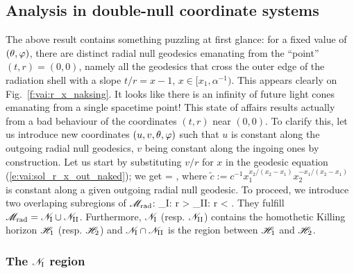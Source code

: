 \subsection{Analysis in double-null coordinate systems}

The above result contains something puzzling at first glance: for a fixed
value of $(\theta,\varphi)$, there are distinct radial null geodesics emanating
from the ``point'' $(t, r) = (0,0)$, namely all the geodesics that
cross the outer edge of the radiation shell with a slope $t/r = x - 1$,
$x\in [x_1, \alpha^{-1})$. %
This appears clearly on Fig.~\ref{f:vai:r_x_naksing}.
It looks like there is an infinity of future light cones emanating
from a single spacetime point!
This state of affairs results actually from a bad behaviour of the coordinates
$(t, r)$ near $(0,0)$. To clarify this, let us introduce new coordinates
$(u, v, \theta, \varphi)$ such that $u$ is constant along the
outgoing radial null geodesics, $v$ being constant along
the ingoing ones by construction. Let us start by substituting $v/r$ for $x$ in
the geodesic equation (\ref{e:vai:sol_r_x_out_naked}); we get
\be \label{e:vai:v_r_out_naked}
     = ,
\ee
where $\tilde{c} := c^{-1} x_1^{x_2/(x_2 - x_1)} x_2^{-x_1/(x_2 - x_1)}$ is
constant along a given outgoing radial null geodesic.
To proceed, we introduce two overlaping subregions of $\mathscr{M}_{\rm rad}$:
\be \label{e:vai:def_NI_NII}
    _{\rm I}: r >  \qand
    _{\rm II}: r <  .
\ee
They fulfill $\mathscr{M}_{\rm rad} = \mathscr{N}_{\rm I} \cup \mathscr{N}_{\rm II}$.
Furthermore, $\mathscr{N}_{\rm I}$ (resp.  $\mathscr{N}_{\rm II}$)
contains the homothetic Killing horizon $\mathscr{H}_1$ (resp. $\mathscr{H}_2$)
and $\mathscr{N}_{\rm I} \cap \mathscr{N}_{\rm II}$ is the region
between $\mathscr{H}_1$ and $\mathscr{H}_2$.

\subsubsection{The $\mathscr{N}_{\rm I}$ region}

